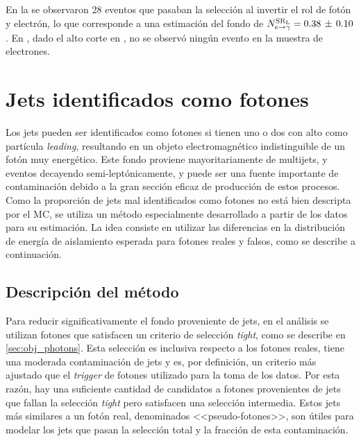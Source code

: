 En la {\SRL} se observaron 28 eventos que pasaban la selección al invertir el
rol de fotón y electrón, lo que corresponde a una estimación del fondo de
$N^{\mathrm{SR}_\mathrm{L}}_{e\rightarrow\gamma} = 0.38\, \pm\, 0.10$. En {\SRH}, dado el alto corte en
{\met}, no se observó ningún evento en la muestra de electrones.



\section{Jets identificados como fotones}
\label{sec:jfakes}

Los jets pueden ser identificados como fotones si tienen uno o dos {\pizero} con
alto {\pt} como partícula \emph{leading}, resultando en un objeto
electromagnético indistinguible de un fotón muy energético. Este fondo
proviene mayoritariamente de multijets, {\wjets} y eventos {\ttbar} decayendo
semi-leptónicamente, y puede ser una fuente importante de contaminación debido a
la gran sección eficaz de producción de estos procesos. Como la proporción de
jets mal identificados como fotones no está bien descripta por el MC, se
utiliza un método especialmente desarrollado a partir de los datos para su estimación.
La idea consiste en utilizar las diferencias en la distribución de energía de aislamiento
esperada para fotones reales y falsos, como se describe a continuación.

\subsection{Descripción del método}

Para reducir significativamente el fondo proveniente de jets, en el análisis se
utilizan fotones que satisfacen un criterio de selección \emph{tight}, como se
describe en \cref{sec:obj_photons}. Esta selección es inclusiva respecto a los
fotones reales, tiene una moderada contaminación de jets y es, por definición,
un criterio más ajustado que el \emph{trigger} de fotones utilizado para la toma de los
datos. Por esta razón, hay una suficiente cantidad de candidatos a fotones
provenientes de jets que fallan la selección \emph{tight} pero satisfacen una
selección intermedia. Estos jets más similares a un fotón real, denominados
<<pseudo-fotones>>, son útiles para modelar los jets que pasan la selección
total y la fracción de esta contaminación.


